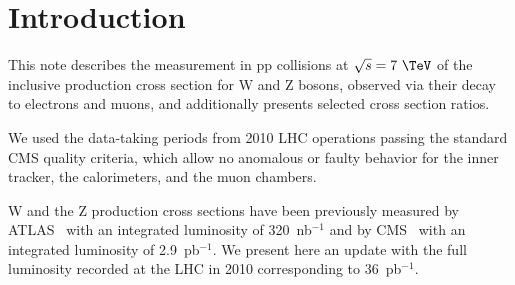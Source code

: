 \section{Introduction}
This note describes the measurement in pp collisions at
$\sqrt{s} = 7~\TeV$ of the inclusive production cross section for W
and Z bosons, observed via their decay to electrons and muons, and
additionally presents selected cross section ratios.

We used the data-taking periods from 2010 LHC operations
passing the standard CMS quality criteria, which allow no anomalous or
faulty behavior for the inner tracker, the calorimeters,
and the muon chambers.

W and the Z production cross sections have been 
previously measured by ATLAS~\cite{WZATLAS:2010} with
an integrated luminosity of 320~nb$^{-1}$ and by 
CMS~\cite{WZCMS:2010} with an integrated luminosity of 2.9~pb$^{-1}$. 
We present here an update with the full luminosity recorded at the LHC 
in 2010 corresponding to 36~pb$^{-1}$.

